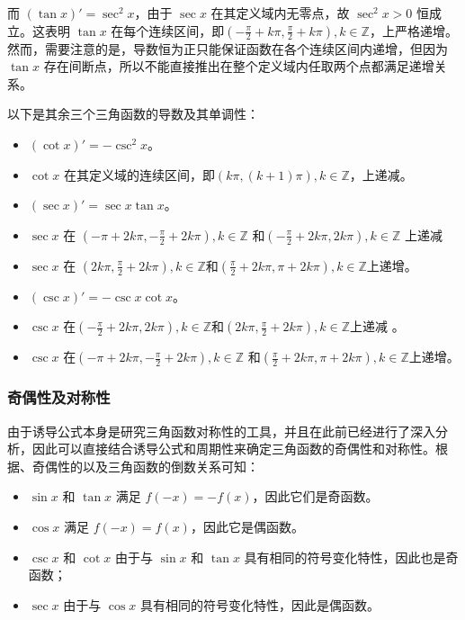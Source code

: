 而 $(\tan x)' = \sec^2 x$，由于 $\sec x$ 在其定义域内无零点，故 $\sec^2 x > 0$ 恒成立。这表明 $\tan x$ 在每个连续区间，即$\displaystyle(-\frac{\pi}{2} +k\pi, \frac{\pi}{2} +k\pi), k \in \mathbb{Z}$，上严格递增。然而，需要注意的是，导数恒为正只能保证函数在各个连续区间内递增，但因为 $\tan x$ 存在间断点，所以不能直接推出在整个定义域内任取两个点都满足递增关系。

以下是其余三个三角函数的导数及其单调性：

\begin{itemize}
\item $(\cot x)' = -\csc^2 x$。
\item $\cot x$ 在其定义域的连续区间，即$(k\pi, (k+1)\pi), k \in \mathbb{Z}$，上递减。
\item $(\sec x)' = \sec x \tan x$。
\item $\sec x$ 在 $\displaystyle\left(-\pi + 2k\pi, -\frac{\pi}{2} +2k\pi\right), k \in \mathbb{Z}$ 和$\displaystyle\left(-\frac{\pi}{2} + 2k\pi, 2k\pi\right), k \in \mathbb{Z}$ 上递减
\item $\sec x$ 在 $\displaystyle\left(2k\pi,\frac{\pi}{2} + 2k\pi\right), k \in \mathbb{Z}$和$\displaystyle\left(\frac{\pi}{2}  + 2k\pi, \pi+2k\pi\right), k \in \mathbb{Z}$上递增。
\item $(\csc x)' = -\csc x \cot x$。
\item $\csc x$ 在$\displaystyle\left(-\frac{\pi}{2} + 2k\pi, 2k\pi\right), k \in \mathbb{Z}$和$\displaystyle\left(2k\pi,\frac{\pi}{2} + 2k\pi\right), k \in \mathbb{Z}$上递减 。
\item $\csc x$ 在$\displaystyle\left(-\pi + 2k\pi, -\frac{\pi}{2} +2k\pi\right), k \in \mathbb{Z}$ 和$\displaystyle\left(\frac{\pi}{2}  + 2k\pi, \pi+2k\pi\right), k \in \mathbb{Z}$上递增。
\end{itemize}

\subsubsection{奇偶性及对称性}

由于诱导公式本身是研究三角函数对称性的工具，并且在此前已经进行了深入分析，因此可以直接结合诱导公式和周期性来确定三角函数的奇偶性和对称性。根据、奇偶性的以及三角函数的倒数关系可知：
\begin{itemize}
\item $\sin x$ 和 $\tan x$ 满足 $f(-x) = -f(x)$，因此它们是奇函数。
\item $\cos x$ 满足 $f(-x) = f(x)$，因此它是偶函数。
\item $\csc x$ 和 $\cot x$ 由于与 $\sin x$ 和 $\tan x$ 具有相同的符号变化特性，因此也是奇函数；
\item $\sec x$ 由于与 $\cos x$ 具有相同的符号变化特性，因此是偶函数。
\end{itemize}

